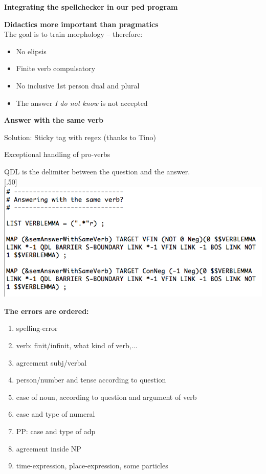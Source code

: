 \documentclass[landscape,norsk,11pt]{seminar}
\begin{document}
\begin{slide}
\newslide
\textbf{Integrating the spellchecker in our ped program}

\newslide
\textbf{Didactics more important than pragmatics} \\
The goal is to train morphology -- therefore:
\begin{itemize}
\item{No elipsis							  }
\item{Finite verb compulsatory}
\item{No inclusive 1st person dual and plural}
\item{The answer \textit{I do not know} is not accepted}
\end{itemize}


\newslide
\textbf{Answer with the same verb}

Solution: Sticky tag with regex (thanks to Tino)

Exceptional handling of pro-verbs 

\newslide
QDL is the delimiter between the question and the answer. \\
\newline
\scalebox{.50}[.50]{\includegraphics{img/answering_same_verb.png}}


\newslide

\textbf{The errors are ordered:}
\begin{enumerate}
\item spelling-error
\item verb: finit/infinit, what kind of verb,...
\item agreement subj/verbal
\item person/number and tense according to question
\item case of noun, according to question and argument of verb 
\item case and type of numeral
\item PP: case and type of adp
\item agreement inside NP
\item time-expression, place-expression, some particles
\end{enumerate}



\end{slide}
\end{document}
